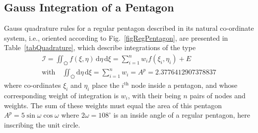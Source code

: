 \subsection{Gauss Integration of a Pentagon}

Gauss quadrature rules for a regular pentagon described in its natural co-ordinate system, i.e., oriented according to Fig.~\ref{figRegPentagon}, are presented in Table~\ref{tabQuadrature}, which describe integrations of the type
\begin{multline}
    \mathcal{I} = \iint_{\pentagon} f ( \xi , \eta) \, \mathrm{d} \eta \, \mathrm{d} \xi = 
    \sum_{i=1}^n w_i f ( \xi_i , \eta_i ) + E \\
    \text{with} \quad
    \iint_{\pentagon} \mathrm{d} \eta \, \mathrm{d} \xi = \sum_{i=1}^n w_i =
    A^p = 2.3776412907378837 
\end{multline}
where co-ordinates $\xi_i$ and $\eta_i$ place the $i^{\text{th}}$ node inside a pentagon, and whose corresponding weight of integration is $w_i$, with their being $n$ pairs of nodes and weights.  The sum of these weights must equal the area of this pentagon $A^p = 5 \sin \omega \cos \omega$ where $2 \omega = 108^{\circ}$ is an inside angle of a regular pentagon, here inscribing the unit circle. 

